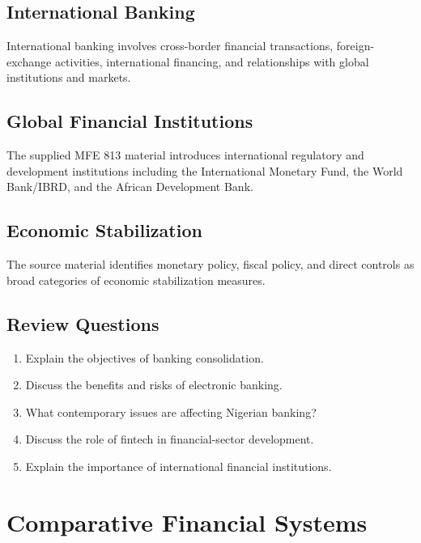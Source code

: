 \documentclass[
]{article}
\providecommand{\tightlist}{%
  \setlength{\itemsep}{0pt}\setlength{\parskip}{0pt}}
\begin{document}
\subsection{International Banking}\label{international-banking}

International banking involves cross-border financial transactions, foreign-exchange activities, international financing, and relationships with global institutions and markets.

\subsection{Global Financial Institutions}\label{global-financial-institutions}

The supplied MFE 813 material introduces international regulatory and development institutions including the International Monetary Fund, the World Bank/IBRD, and the African Development Bank.

\subsection{Economic Stabilization}\label{economic-stabilization}

The source material identifies monetary policy, fiscal policy, and direct controls as broad categories of economic stabilization measures.

\subsection{Review Questions}\label{review-questions-6}

\begin{enumerate}
\def\labelenumi{\arabic{enumi}.}
\tightlist
\item
  Explain the objectives of banking consolidation.
\item
  Discuss the benefits and risks of electronic banking.
\item
  What contemporary issues are affecting Nigerian banking?
\item
  Discuss the role of fintech in financial-sector development.
\item
  Explain the importance of international financial institutions.
\end{enumerate}

\section{Comparative Financial Systems}\label{comparative-financial-systems}
\end{document}

